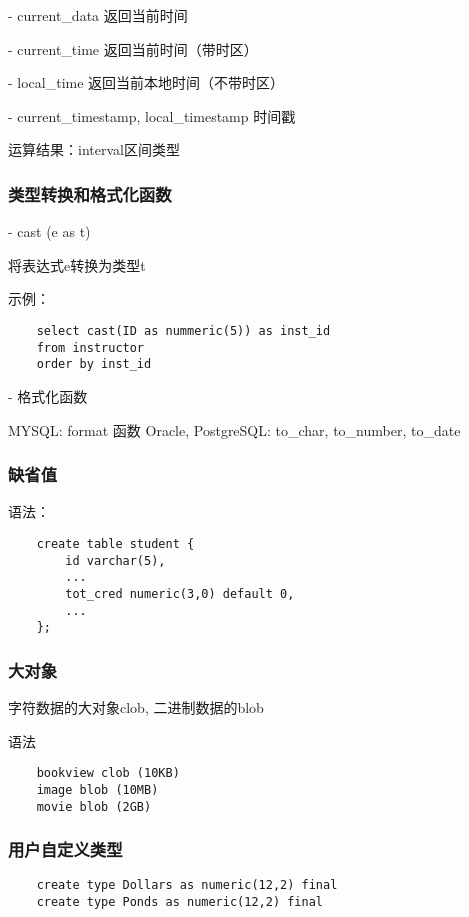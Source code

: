 \documentclass{article}        %
\begin{document}
- current\_data 返回当前时间 

- current\_time 返回当前时间（带时区） 

- local\_time 返回当前本地时间（不带时区） 

- current\_timestamp, local\_timestamp 时间戳 

运算结果：interval区间类型

\subsubsection{类型转换和格式化函数}

- cast (e as t)

将表达式e转换为类型t 

示例：

\begin{verbatim}
    select cast(ID as nummeric(5)) as inst_id 
    from instructor 
    order by inst_id 
\end{verbatim}

- 格式化函数 

MYSQL: format 函数 
Oracle, PostgreSQL: to\_char, to\_number, to\_date 

\subsubsection{缺省值} 

语法：

\begin{verbatim}
    create table student {
        id varchar(5), 
        ... 
        tot_cred numeric(3,0) default 0, 
        ... 
    };
\end{verbatim}

\subsubsection{大对象}

字符数据的大对象clob, 二进制数据的blob 

语法 

\begin{verbatim}
    bookview clob (10KB) 
    image blob (10MB) 
    movie blob (2GB)
\end{verbatim}

\subsubsection{用户自定义类型}

\begin{verbatim}
    create type Dollars as numeric(12,2) final 
    create type Ponds as numeric(12,2) final 
\end{verbatim}
\end{document}
